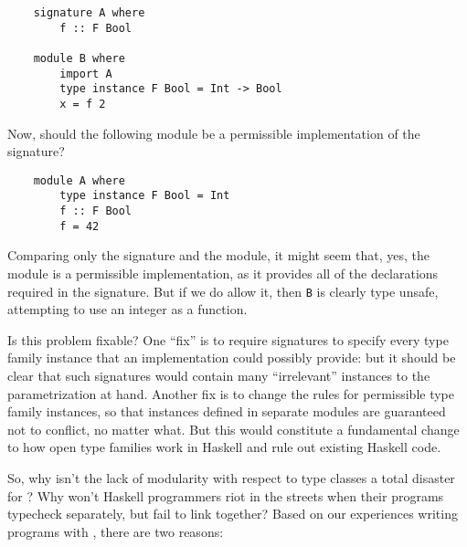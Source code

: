 \begin{lstlisting}
    signature A where
        f :: F Bool

    module B where
        import A
        type instance F Bool = Int -> Bool
        x = f 2
\end{lstlisting}
%
Now, should the following module be a permissible implementation of the
signature?

\begin{lstlisting}
    module A where
        type instance F Bool = Int
        f :: F Bool
        f = 42
\end{lstlisting}
%
Comparing only the signature and the module, it might seem that, yes,
the module is a permissible implementation, as it provides all of the
declarations required in the signature.  But if we do allow it,
then \verb|B| is clearly type unsafe, attempting to use an integer
as a function.

Is this problem fixable?  One ``fix'' is to require signatures to
specify every type family instance that an implementation could possibly provide:
but it should be clear that such signatures would contain many ``irrelevant''
instances to the parametrization at hand.  Another fix is to change the rules for
permissible type family instances, so that instances defined in separate
modules are guaranteed not to conflict, no matter what.  But this would
constitute a fundamental change to how open type families work in
Haskell and rule out existing Haskell code.

So, why isn't the lack of modularity with respect to type classes a
total disaster for \Backpack{}?  Why won't Haskell programmers riot in
the streets when their programs typecheck separately, but fail to link
together?  Based on our experiences writing programs with
\Backpack{}, there are two reasons:

